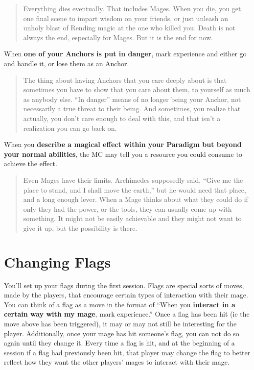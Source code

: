 \documentclass[
  oneside,
  statementpaper,
  9pt]{memoir}
\begin{document}
\begin{quote}
Everything dies eventually. That includes Mages. When you die, you get
one final scene to impart wisdom on your friends, or just unleash an
unholy blast of Rending magic at the one who killed you. Death is not
always the end, especially for Mages. But it is the end for now.
\end{quote}

When \textbf{one of your Anchors is put in danger}, mark experience and
either go and handle it, or lose them as an Anchor.

\begin{quote}
The thing about having Anchors that you care deeply about is that
sometimes you have to show that you care about them, to yourself as much
as anybody else. ``In danger'' means of no longer being your Anchor, not
necessarily a true threat to their being. And sometimes, you realize
that actually, you don't care enough to deal with this, and that isn't a
realization you can go back on.
\end{quote}

When you \textbf{describe a magical effect within your Paradigm but
beyond your normal abilities}, the MC may tell you a resource you could
consume to achieve the effect.

\begin{quote}
Even Mages have their limits. Archimedes supposedly said, ``Give me the
place to stand, and I shall move the earth,'' but he would need that
place, and a long enough lever. When a Mage thinks about what they could
do if only they had the power, or the tools, they can usually come up
with something. It might not be easily achievable and they might not
want to give it up, but the possibility is there.
\end{quote}

\hypertarget{changing-flags}{%
\section{Changing Flags}\label{changing-flags}}

You'll set up your flags during the first session. Flags are special
sorts of moves, made by the players, that encourage certain types of
interaction with their mage. You can think of a flag as a move in the
format of ``When you \textbf{interact in a certain way with my mage},
mark experience.'' Once a flag has been hit (ie the move above has been
triggered), it may or may not still be interesting for the player.
Additionally, once your mage has hit someone's flag, you can not do so
again until they change it. Every time a flag is hit, and at the
beginning of a session if a flag had previously been hit, that player
may change the flag to better reflect how they want the other players'
mages to interact with their mage.
\end{document}
